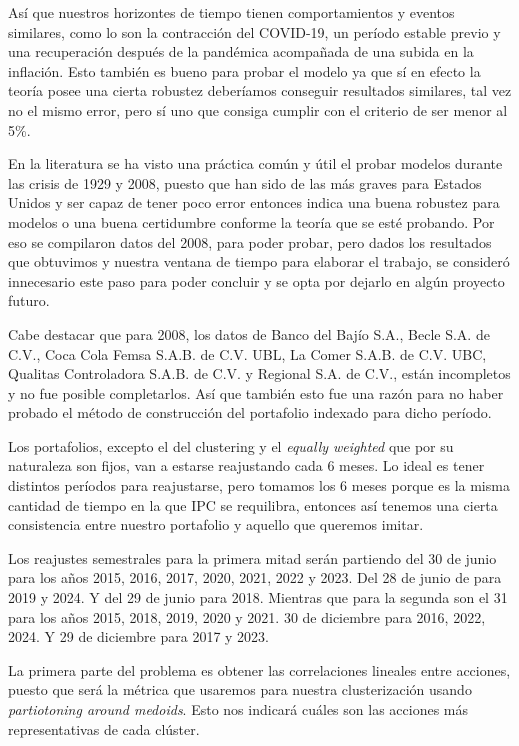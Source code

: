 \documentclass[
]{article}
\begin{document}
Así que nuestros horizontes de tiempo tienen comportamientos y eventos similares,
como lo son la contracción del COVID-19, un período estable previo y una
recuperación después de la pandémica acompañada de una subida en la inflación.
Esto también es bueno para probar el modelo ya que sí en efecto la teoría posee
una cierta robustez deberíamos conseguir resultados similares, tal vez no el mismo
error, pero sí uno que consiga cumplir con el criterio de ser menor al 5\%.

En la literatura se ha visto una práctica común y útil el probar modelos durante las
crisis de 1929 y 2008, puesto que han sido de las más graves para Estados Unidos
y ser capaz de tener poco error entonces indica una buena robustez para modelos
o una buena certidumbre conforme la teoría que se esté probando. Por eso se
compilaron datos del 2008, para poder probar, pero dados los resultados que
obtuvimos y nuestra ventana de tiempo para elaborar el trabajo, se consideró
innecesario este paso para poder concluir y se opta por dejarlo en algún proyecto
futuro.


Cabe destacar que para 2008, los datos de Banco del Bajío S.A., Becle
S.A. de C.V., Coca Cola Femsa S.A.B. de C.V. UBL, La Comer S.A.B. de
C.V. UBC, Qualitas Controladora S.A.B. de C.V. y Regional S.A. de C.V.,
están incompletos y no fue posible completarlos. Así que también esto 
fue una razón para no haber probado el método de construcción 
del portafolio indexado para dicho período.

Los portafolios, excepto el del clustering y el \emph{equally weighted}
que por su naturaleza son fijos, van a estarse reajustando cada 6 meses.
Lo ideal es tener distintos períodos para reajustarse, pero tomamos los
6 meses porque es la misma cantidad de tiempo en la que IPC se
requilibra, entonces así tenemos una cierta consistencia entre nuestro
portafolio y aquello que queremos imitar.

Los reajustes semestrales para la primera mitad serán partiendo del 30 de
junio para los años 2015, 2016, 2017, 2020, 2021, 2022 y 2023. Del 28 de
junio de para 2019 y 2024. Y del 29 de junio para 2018. Mientras que para la
segunda son el 31 para los años 2015, 2018, 2019, 2020 y 2021. 30 de
diciembre para 2016, 2022, 2024. Y 29 de diciembre para 2017 y 2023.

La primera parte del problema es obtener las correlaciones lineales
entre acciones, puesto que será la métrica que usaremos para nuestra
clusterización usando \emph{partiotoning around medoids}. Esto nos
indicará cuáles son las acciones más representativas de cada clúster.
\end{document}
